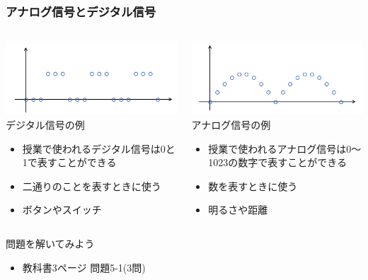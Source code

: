 \begin{frame}[fragile]
    \frametitle{アナログ信号とデジタル信号}
    \begin{columns}
        \begin{column}{0.48\textwidth}
            \includegraphics[width=\textwidth]{images/chap05/text05-img002.png} 
            {デジタル信号の例}
            \vspace{2pt}
            \begin{itemize}
                \item 授業で使われるデジタル信号は0と1で表すことができる
                \item 二通りのことを表すときに使う
                \item ボタンやスイッチ
            \end{itemize}
        \end{column}
        \begin{column}{0.48\textwidth}
            \includegraphics[width=\textwidth]{images/chap05/text05-img003.png} 
            {アナログ信号の例}
            \vspace{2pt}
            \begin{itemize}
                \item 授業で使われるアナログ信号は0〜1023の数字で表すことができる
                \item 数を表すときに使う
                \item 明るさや距離
            \end{itemize}
        \end{column}
    \end{columns}
\end{frame}

\begin{frame}[fragile]
    \begin{exampleblock}{問題を解いてみよう}
        \begin{itemize}
            \item 教科書3ページ 問題5-1(3問)
        \end{itemize}
    \end{exampleblock} 
\end{frame}
